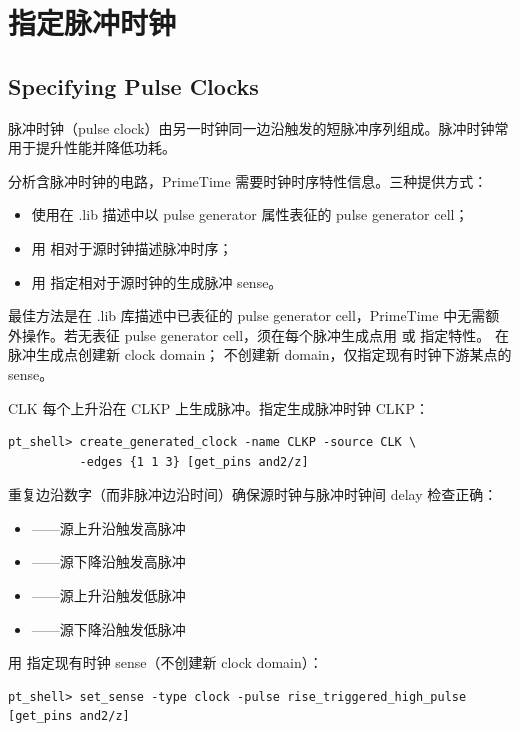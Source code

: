 \section{指定脉冲时钟}
\subsection*{Specifying Pulse Clocks}

脉冲时钟（pulse clock）由另一时钟同一边沿触发的短脉冲序列组成。脉冲时钟常用于提升性能并降低功耗。

分析含脉冲时钟的电路，PrimeTime 需要时钟时序特性信息。三种提供方式：
\begin{itemize}
  \item 使用在 .lib 描述中以 pulse generator 属性表征的 pulse generator cell；
  \item 用  相对于源时钟描述脉冲时序；
  \item 用  指定相对于源时钟的生成脉冲 sense。
\end{itemize}

最佳方法是在 .lib 库描述中已表征的 pulse generator cell，PrimeTime 中无需额外操作。若无表征 pulse generator cell，须在每个脉冲生成点用  或  指定特性。 在脉冲生成点创建新 clock domain； 不创建新 domain，仅指定现有时钟下游某点的 sense。


CLK 每个上升沿在 CLKP 上生成脉冲。指定生成脉冲时钟 CLKP：
\begin{lstlisting}
pt_shell> create_generated_clock -name CLKP -source CLK \
          -edges {1 1 3} [get_pins and2/z]
\end{lstlisting}

重复边沿数字（而非脉冲边沿时间）确保源时钟与脉冲时钟间 delay 检查正确：
\begin{itemize}
  \item {}——源上升沿触发高脉冲
  \item {}——源下降沿触发高脉冲
  \item {}——源上升沿触发低脉冲
  \item {}——源下降沿触发低脉冲
\end{itemize}

用  指定现有时钟 sense（不创建新 clock domain）：
\begin{lstlisting}
pt_shell> set_sense -type clock -pulse rise_triggered_high_pulse [get_pins and2/z]
\end{lstlisting}

